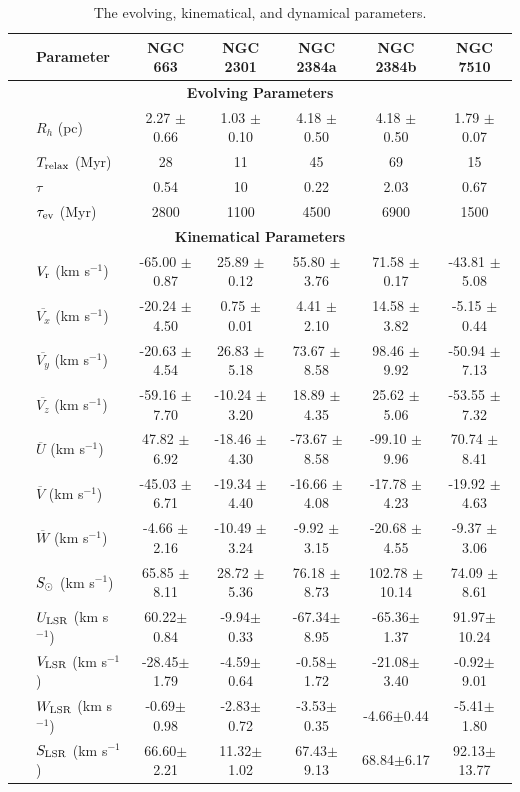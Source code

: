 \documentclass[referee]{raa}            %
\begin{document}
\begin{table}
\centering
\scriptsize
\renewcommand{\arraystretch}{0.75}
\caption{The evolving, kinematical, and dynamical parameters.}
\begin{tabular}{ll|ccccc}
\toprule
&\textbf{Parameter} & \textbf{NGC 663} & \textbf{NGC 2301} & \textbf{NGC 2384a} & \textbf{NGC 2384b} & \textbf{NGC 7510} \\
\hline\hline
\multicolumn{7}{c}{\textbf{Evolving Parameters}} \\
\midrule\
&$R_h$ (pc) & 2.27 $\pm$ 0.66 & 1.03 $\pm$ 0.10 & 4.18 $\pm$ 0.50 & 4.18 $\pm$ 0.50 & 1.79 $\pm$ 0.07 \\
&$T_{\rm relax}$ (Myr) & 28 & 11 & 45 & 69 & 15 \\
&$\tau$ & 0.54 & 10 & 0.22 & 2.03 & 0.67\\
&$\tau_{\rm ev}$ (Myr) &2800 & 1100 & 4500 & 6900 & 1500 \\
\hline\hline
\multicolumn{7}{c}{\textbf{Kinematical Parameters}} \\
\midrule
&$V_{\rm r}$ (km s$^{-1}$) &  -65.00 $\pm$ 0.87 & 25.89 $\pm$ 0.12 & 55.80 $\pm$ 3.76 & 71.58 $\pm$ 0.17 & -43.81 $\pm$ 5.08   \\
&$\overline{V_x}$ (km s$^{-1}$) &  -20.24 $\pm$ 4.50 & 0.75 $\pm$ 0.01 & 4.41 $\pm$ 2.10 & 14.58 $\pm$ 3.82 & -5.15 $\pm$ 0.44   \\
&$\overline{V_y}$ (km s$^{-1}$) &  -20.63 $\pm$ 4.54 & 26.83 $\pm$ 5.18 & 73.67 $\pm$ 8.58 & 98.46 $\pm$ 9.92 & -50.94 $\pm$ 7.13   \\
&$\overline{V_z}$ (km s$^{-1}$) &  -59.16 $\pm$ 7.70 & -10.24 $\pm$ 3.20 & 18.89 $\pm$ 4.35 & 25.62 $\pm$ 5.06 & -53.55 $\pm$ 7.32   \\
&$\overline{U}$ (km s$^{-1}$) &  47.82 $\pm$ 6.92 & -18.46 $\pm$ 4.30 & -73.67 $\pm$ 8.58 & -99.10 $\pm$ 9.96 & 70.74 $\pm$ 8.41   \\
&$\overline{V}$ (km s$^{-1}$) &  -45.03 $\pm$ 6.71 & -19.34 $\pm$ 4.40 & -16.66 $\pm$ 4.08 & -17.78 $\pm$ 4.23 & -19.92 $\pm$ 4.63   \\
&$\overline{W}$ (km s$^{-1}$) &  -4.66 $\pm$ 2.16 & -10.49 $\pm$ 3.24 & -9.92 $\pm$ 3.15 & -20.68 $\pm$ 4.55 & -9.37 $\pm$ 3.06   \\
&$S_{\rm \odot}$ (km s$^{-1}$) &  65.85 $\pm$ 8.11 & 28.72 $\pm$ 5.36 & 76.18 $\pm$ 8.73 & 102.78 $\pm$ 10.14 & 74.09 $\pm$ 8.61   \\
&$U_{\rm LSR}$ (km s$^{-1}$) &  60.22$\pm$0.84 &-9.94$\pm$0.33   &-67.34$\pm$8.95  &-65.36$\pm$1.37  &91.97$\pm$10.24   \\
&$V_{\rm LSR}$ (km s$^{-1}$) &  -28.45$\pm$1.79 &-4.59$\pm$0.64  &-0.58$\pm$1.72   &-21.08$\pm$3.40  &-0.92$\pm$9.01   \\
&$W_{\rm LSR}$ (km s$^{-1}$) &  -0.69$\pm$0.98 &-2.83$\pm$0.72   &-3.53$\pm$0.35  &-4.66$\pm$0.44    &-5.41$\pm$1.80   \\
&$S_{\rm LSR}$ (km s$^{-1}$) &66.60$\pm$2.21   &11.32$\pm$1.02   &67.43$\pm$9.13  &68.84$\pm$6.17    &92.13$\pm$13.77\\


\end{tabular}
\end{table}
\end{document}

